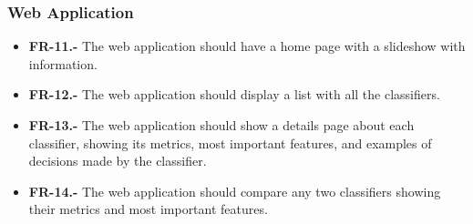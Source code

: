\subsubsection{Web Application}

\begin{itemize}
    \item \textbf{FR-11.-} The web application should have a home page with a slideshow with information.
    \item \textbf{FR-12.-} The web application should display a list with all the classifiers.
    \item \textbf{FR-13.-} The web application should show a details page about each classifier, showing its metrics, most important features, and examples of decisions made by the classifier.
    \item \textbf{FR-14.-} The web application should compare any two classifiers showing their metrics and most important features.
\end{itemize}
